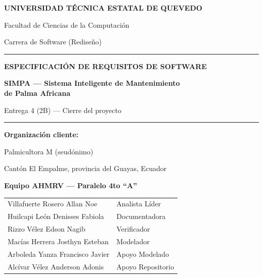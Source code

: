 \documentclass[11pt,a4paper]{article}
\begin{document}
\begin{titlepage}
\centering
\vspace*{0.8cm}
{\Large\bfseries UNIVERSIDAD TÉCNICA ESTATAL DE QUEVEDO\par}
\vspace{0.3cm}
{\large Facultad de Ciencias de la Computación\par}
{\large Carrera de Software (Rediseño)\par}
\vspace{1.2cm}
\rule{\textwidth}{1.2pt}\par
\vspace{0.5cm}
{\LARGE\bfseries\color{uteqverde} ESPECIFICACIÓN DE REQUISITOS DE SOFTWARE\par}
\vspace{0.4cm}
{\Large\bfseries SIMPA --- Sistema Inteligente de Mantenimiento\\[0.2cm] de Palma Africana\par}
\vspace{0.4cm}
{\large Entrega 4 (2B) --- Cierre del proyecto\par}
\vspace{0.5cm}
\rule{\textwidth}{1.2pt}\par
\vspace{1.0cm}

{\large\bfseries Organización cliente:\par}
{\large Palmicultora M (seudónimo)\par}
{\normalsize Cantón El Empalme, provincia del Guayas, Ecuador\par}
\vspace{0.8cm}

{\bfseries Equipo AHMRV --- Paralelo 4to ``A''\par}
\vspace{0.3cm}
\begin{tabular}{ll}
Villafuerte Rosero Allan Noe & Analista Líder \\
Huilcapi León Denisses Fabiola & Documentadora \\
Rizzo Vélez Edson Nagib & Verificador \\
Macías Herrera Josthyn Esteban & Modelador \\
Arboleda Yanza Francisco Javier & Apoyo Modelado \\
Alcívar Vélez Anderson Adonis & Apoyo Repositorio \\
\end{tabular}


\end{titlepage}
\end{document}
